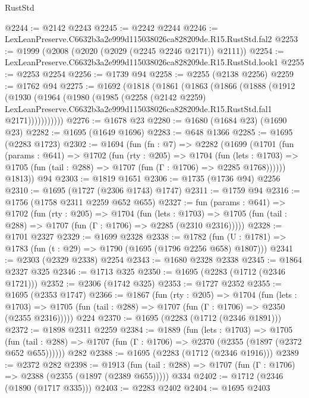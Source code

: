 \begin{lexlean}{RustStd}
\begin{coremodule}
@2244 := @2142 @2243
@2245 := @2242 @2244
@2246 := LexLeanPreserve.C6632b3a2e999d115038026ca828209de.R15.RustStd.fal2
@2253 := @1999 (@2008 (@2020 (@2029 (@2245 @2246 @2171)) @2111))
@2254 := LexLeanPreserve.C6632b3a2e999d115038026ca828209de.R15.RustStd.look1
@2255 := @2253 @2254
@2256 := @1739 @94
@2258 := @2255 (@2138 @2256)
@2259 := @1762 @94
@2275 := @1692
    (@1818
      (@1861
        (@1863
          (@1866
            (@1888
              (@1912
                (@1930
                  (@1964
                    (@1980
                      (@1985
                        (@2258
                          (@2142 @2259)
                          LexLeanPreserve.C6632b3a2e999d115038026ca828209de.R15.RustStd.fal1
                          @2171)))))))))))
@2276 := @1678 @23
@2280 := @1680 (@1684 @23) (@1690 @23)
@2282 := @1695 (@1649 @1696)
@2283 := @648 @1366
@2285 := @1695 (@2283 @1723)
@2302 := @1694
    (fun (fn : @7) =>
    @2282
      (@1699
        (@1701
          (fun (params : @641) =>
          @1702
            (fun (rty : @205) =>
            @1704
              (fun (lets : @1703) =>
              @1705 (fun (tail : @288) => @1707 (fun (Γ : @1706) => @2285 @1768))))))
        @1813))
    @94
@2303 := @1819 @1651
@2306 := @1735 (@1736 @94) @2256
@2310 := @1695 (@1727 (@2306 @1743) @1747)
@2311 := @1759 @94
@2316 := @1756 (@1758 @2311 @2259 @652 @655)
@2327 := fun (params : @641) =>
  @1702
    (fun (rty : @205) =>
    @1704
      (fun (lets : @1703) =>
      @1705 (fun (tail : @288) => @1707 (fun (Γ : @1706) => @2285 (@2310 @2316)))))
@2328 := @1701 @2327
@2329 := @1699 @2328
@2338 := @1782 (fun (U : @1781) => @1783 (fun (t : @29) => @1790 (@1695 (@1796 @2256 @658) @1807)))
@2341 := @2303 (@2329 @2338) @2254
@2343 := @1680 @2328 @2338
@2345 := @1864 @2327 @325
@2346 := @1713 @325
@2350 := @1695 (@2283 (@1712 (@2346 @1721)))
@2352 := @2306 (@1742 @325)
@2353 := @1727 @2352
@2355 := @1695 (@2353 @1747)
@2366 := @1867
    (fun (rty : @205) =>
    @1704
      (fun (lets : @1703) =>
      @1705 (fun (tail : @288) => @1707 (fun (Γ : @1706) => @2350 (@2355 @2316)))))
    @224
@2370 := @1695 (@2283 (@1712 (@2346 @1891)))
@2372 := @1898 @2311 @2259
@2384 := @1889
    (fun (lets : @1703) =>
    @1705 (fun (tail : @288) => @1707 (fun (Γ : @1706) => @2370 (@2355 (@1897 (@2372 @652 @655))))))
    @282
@2388 := @1695 (@2283 (@1712 (@2346 @1916)))
@2389 := @2372 @282
@2398 := @1913
    (fun (tail : @288) => @1707 (fun (Γ : @1706) => @2388 (@2355 (@1897 (@2389 @655)))))
    @334
@2402 := @1712 (@2346 (@1890 (@1717 @335)))
@2403 := @2283 @2402
@2404 := @1695 @2403

\end{coremodule}
\end{lexlean}
